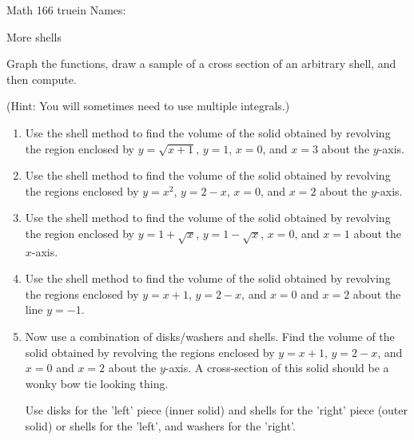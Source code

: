 \documentclass[12pt]{article}
\newtheorem*{goal}{Goal}
\begin{document}
\pagestyle{empty} %

\noindent
{Math 166  truein  Names:\ \hrulefill}

\noindent
{More shells}

\medskip

\noindent Graph the functions, draw a sample of a cross section of an arbitrary shell, and then compute.

\noindent(Hint: You will sometimes need to use multiple integrals.)

\begin{enumerate}

\item Use the shell method to find the volume of the solid obtained by revolving the region enclosed by $y = \sqrt{x+1}$, $y = 1$, $x = 0$, and $x=3$ about the $y$-axis.

\vspace{4in}
	
\item Use the shell method to find the volume of the solid obtained by revolving the regions enclosed by $y = x^2$, $y = 2-x$, $x = 0$, and $x=2$ about the $y$-axis.


\vspace{4in}

\item Use the shell method to find the volume of the solid obtained by revolving the region enclosed by $y = 1+\sqrt{x}$, $y = 1-\sqrt{x}$, $x = 0$, and $x=1$ about the $x$-axis.

\vspace{4in}

\item Use the shell method to find the volume of the solid obtained by revolving the regions enclosed by $y = x+1$, $y = 2 - x$, and $x = 0$  and $x=2$ about the line $y= -1$.
\newpage

\item Now use a combination of disks/washers and shells. Find the volume of the solid obtained by revolving the regions enclosed by $y = x+1$, $y = 2 - x$, and $x = 0$  and $x=2$ about the $y$-axis. A cross-section of this solid should be a wonky bow tie looking thing.

Use disks for the 'left' piece (inner solid) and shells for the 'right' piece (outer solid) or shells for the 'left', and washers for the 'right'.

\end{enumerate}
\end{document}
